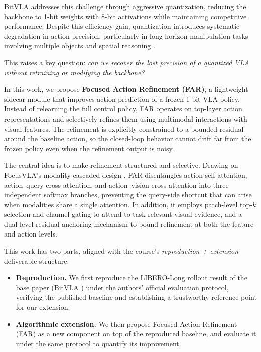 \documentclass[conference]{IEEEtran}
\begin{document}
BitVLA addresses this challenge through aggressive quantization, reducing the backbone to 1-bit weights with 8-bit activations while maintaining competitive performance. Despite this efficiency gain, quantization introduces systematic degradation in action precision, particularly in long-horizon manipulation tasks involving multiple objects and spatial reasoning \cite{wang2025bitvla}. 

This raises a key question: \emph{can we recover the lost precision of a quantized VLA without retraining or modifying the backbone?}

In this work, we propose \textbf{Focused Action Refinement (FAR)}, a lightweight sidecar module that improves action prediction of a frozen 1-bit VLA policy. Instead of relearning the full control policy, FAR operates on top-layer action representations and selectively refines them using multimodal interactions with visual features. The refinement is explicitly constrained to a bounded residual around the baseline action, so the closed-loop behavior cannot drift far from the frozen policy even when the refinement output is noisy.

The central idea is to make refinement structured and selective. Drawing on FocusVLA's modality-cascaded design \cite{zhang2026focusvla}, FAR disentangles action self-attention, action--query cross-attention, and action--vision cross-attention into three independent softmax branches, preventing the query-side shortcut that can arise when modalities share a single attention. In addition, it employs patch-level top-$k$ selection and channel gating to attend to task-relevant visual evidence, and a dual-level residual anchoring mechanism to bound refinement at both the feature and action levels.

This work has two parts, aligned with the course's \emph{reproduction + extension} deliverable structure:
\begin{itemize}
    \item \textbf{Reproduction.} We first reproduce the LIBERO-Long rollout result of the base paper (BitVLA \cite{wang2025bitvla}) under the authors' official evaluation protocol, verifying the published baseline and establishing a trustworthy reference point for our extension.
    \item \textbf{Algorithmic extension.} We then propose Focused Action Refinement (FAR) as a new component on top of the reproduced baseline, and evaluate it under the same protocol to quantify its improvement.
\end{itemize}
\end{document}
